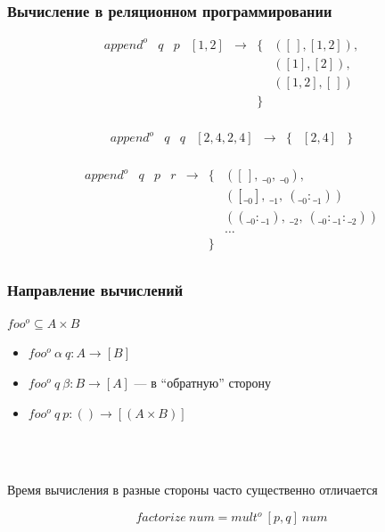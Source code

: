 \documentclass{beamer}
\begin{document}
\begin{frame}[fragile]
  \transwipe[direction=90]
  \frametitle{Вычисление в реляционном программировании}

$$ 
\begin{array}{lcccccl}
append^o & q & p & [1, 2] &\rightarrow& \{ & ([\,], [1,2]), \\
         &   &   &        &           &    & ([1], [2]), \\
         &   &   &        &           &    & ([1,2], [\,]) \\
         &   &   &        &           & \} \\
\end{array}
$$ 

$$
\begin{array}{lccccclc}
append^o & q & q & [2, 4, 2, 4] &\rightarrow& \{ &  [2, 4]  &    \} \\
\end{array}
$$ 

$$
\begin{array}{lcccccl}
append^o & q & p & r    &\rightarrow& \{ &([\,], \ \__0, \ \__0), \\
         &   &   &        &           &    & ([\__0], \  \__1, \ (\__0:\__1)) \\
         &   &   &        &           &    & ((\__0 : \__1),\  \__2, \ (\__0:\__1:\__2)) \\
         &   &   &        &           &    & \dots \\
         &   &   &        &           &    \}  \\
\end{array}
$$

\end{frame}


\begin{frame}[fragile]
  \transwipe[direction=90]
  \frametitle{Направление вычислений}

\begin{center}
  $foo^o \subseteq A \times B$
\end{center}

\begin{itemize}
  \item $foo^o \ \alpha \ q : A \rightarrow [B]$
  \item $foo^o \ q \ \beta  : B \rightarrow [A]$ --- в ``обратную'' сторону
  \item $foo^o \ q \ p      : () \rightarrow [(A \times B)] $ 
\end{itemize}  
  
\pause  

~\\~

Время вычисления в разные стороны часто существенно отличается

\pause 

$$
factorize \ num = mult^o \ [p, q] \ num 
$$
\end{frame}
\end{document}
